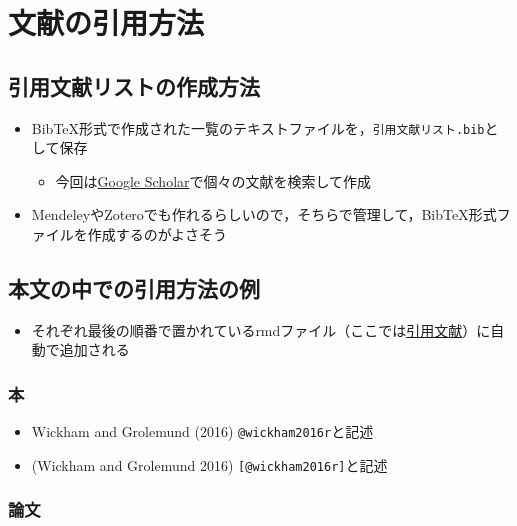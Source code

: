 \documentclass[xelatex, ja=standard, b5paper]{bxjsbook}
\providecommand{\tightlist}{%
  \setlength{\itemsep}{0pt}\setlength{\parskip}{0pt}}
\begin{document}
\hypertarget{bunken}{%
\chapter{文献の引用方法}\label{bunken}}

\hypertarget{bunken_list}{%
\section{引用文献リストの作成方法}\label{bunken_list}}

\begin{itemize}
\tightlist
\item
  BibTeX形式で作成された一覧のテキストファイルを，\texttt{引用文献リスト.bib}として保存

  \begin{itemize}
  \tightlist
  \item
    今回は\href{https://scholar.google.co.jp/}{Google Scholar}で個々の文献を検索して作成
  \end{itemize}
\item
  MendeleyやZoteroでも作れるらしいので，そちらで管理して，BibTeX形式ファイルを作成するのがよさそう
\end{itemize}

\hypertarget{bunken_example}{%
\section{本文の中での引用方法の例}\label{bunken_example}}

\begin{itemize}
\tightlist
\item
  それぞれ最後の順番で置かれているrmdファイル（ここでは\protect\hyperlink{reference}{引用文献}）に自動で追加される
\end{itemize}

\hypertarget{ux672c}{%
\subsection*{本}\label{ux672c}}

\begin{itemize}
\tightlist
\item
  Wickham and Grolemund (2016) \texttt{@wickham2016r}と記述
\item
  (Wickham and Grolemund 2016) \texttt{{[}@wickham2016r{]}}と記述
\end{itemize}

\hypertarget{ux8ad6ux6587}{%
\subsection*{論文}\label{ux8ad6ux6587}}
\end{document}
